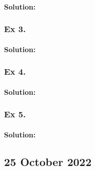 	\paragraph{Solution:}
		
	\subsubsection{Ex 3.}	
	\configuratedText{
	\begin{enumerate}
	\item 
	\item
	\item 
	\end{enumerate}}

	\paragraph{Solution:}
		
	\subsubsection{Ex 4.}	
	\configuratedText{
	\begin{enumerate}
	\item 
	\item
	\item 
	\end{enumerate}}

	\paragraph{Solution:}
		
	\subsubsection{Ex 5.}	
	\configuratedText{
	\begin{enumerate}
	\item 
	\item
	\item 
	\end{enumerate}}

	\paragraph{Solution:}
	
	\newpage
	\subsection{25 October 2022}	

